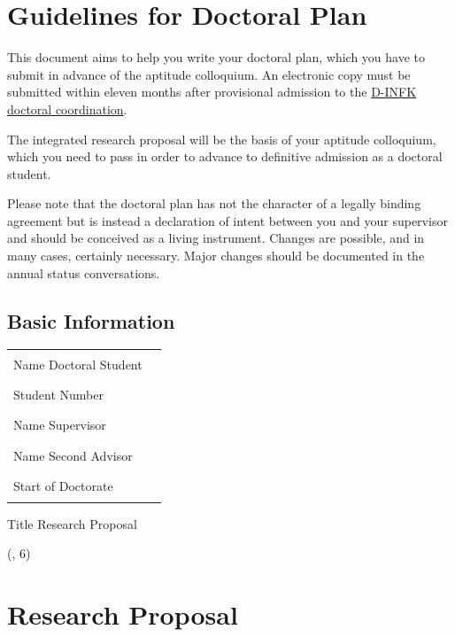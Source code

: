 \documentclass[11pt]{article}
\begin{document}
\setlength{\headheight}{10 \baselineskip}  %
\setlength{\parindent}{0pt}  %
\setlength{\parskip}{\baselineskip}  %


\section*{Guidelines for Doctoral Plan}

This document aims to help you write your doctoral plan, which you have to submit in advance of the aptitude colloquium.
An electronic copy must be submitted within eleven months after provisional admission to the \href{mailto:bernadette.gianesi@inf.ethz.ch?subject=Research\%20Plan}{D-INFK doctoral coordination}.

The integrated research proposal will be the basis of your aptitude colloquium, which you need to pass in order to advance to definitive admission as a doctoral student. 

Please note that the doctoral plan has not the character of a legally binding agreement but is instead a declaration of intent between you and your supervisor and should be conceived as a living instrument.
Changes are possible, and in many cases, certainly necessary.
Major changes should be documented in the annual status conversations.

\subsection*{Basic Information}

\begin{tabular}{l l}
    Name Doctoral Student & \rule{12cm}{0.15mm}\\[10pt]
    Student Number & \rule{12cm}{0.15mm}\\[10pt]
    Name Supervisor & \rule{12cm}{0.15mm}\\[10pt]
    Name Second Advisor & \rule{12cm}{0.15mm}\\[10pt] 
    Start of Doctorate & \rule{12cm}{0.15mm}\\
\end{tabular}

Title Research Proposal

\framebox(\linewidth, 6\baselineskip){%
}



\section{Research Proposal}
\end{document}
